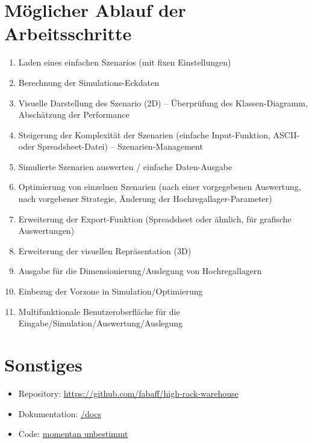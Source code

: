 \documentclass[11pt,a4paper]{article}
\begin{document}
\section{Möglicher Ablauf der Arbeitsschritte}

\begin{enumerate}
  \item Laden eines einfachen Szenarios (mit fixen Einstellungen)
  \item Berechnung der Simulations-Eckdaten
  \item Visuelle Darstellung des Szenario (2D) -- Überprüfung des Klassen-Diagramm, Abschätzung der Performance
  \item Steigerung der Komplexität der Szenarien (einfache Input-Funktion, ASCII- oder Spreadsheet-Datei) -- Szenarien-Management
  \item Simulierte Szenarien auswerten / einfache Daten-Ausgabe
  \item Optimierung von einzelnen Szenarien (nach einer vorgegebenen Auswertung, nach vorgebener Strategie, Änderung der Hochregallager-Parameter)
  \item Erweiterung der Export-Funktion (Spreadsheet oder ähnlich, für grafische Auswertungen)
  \item Erweiterung der visuellen Repräsentation (3D)
  \item Ausgabe für die Dimensionierung/Auslegung von Hochregallagern
  \item Einbezug der Vorzone in Simulation/Optimierung
  \item Multifunktionale Benutzeroberfläche für die Eingabe/Simulation/Auswertung/Auslegung
\end{enumerate}
%
\section{Sonstiges}
\begin{itemize}
  \item Repository: \href{https://github.com/fabaff/high-rack-warehouse}{https://github.com/fabaff/high-rack-warehouse}
  \item Dokumentation: \href{https://github.com/fabaff/high-rack-warehouse/tree/master/docs}{/docs}
  \item Code: \href{https://github.com/fabaff/high-rack-warehouse/}{momentan unbestimmt}
\end{itemize}
\end{document}
